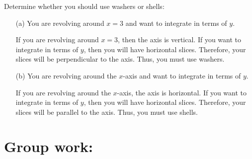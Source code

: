 \documentclass[handout]{ximera}
\begin{document}
	\begin{problem}
Determine whether you should use washers or shells:
\begin{itemize}

	\item[(a)] You are revolving around $x=3$ and want to integrate in terms of $y$.

	\begin{freeResponse}
	If you are revolving around $x=3$, then the axis is vertical.  If you want to integrate in terms of $y$, then you will have horizontal slices.  Therefore, your slices will be perpendicular to the axis.  Thus, you must use washers.
	\end{freeResponse}
	
	\item[(b)] You are revolving around the $x$-axis and want to integrate in terms of $y$.

	\begin{freeResponse}
	If you are revolving around the $x$-axis, the axis is horizontal.  If you want to integrate in terms of $y$, then you will have horizontal slices.  Therefore, your slices will be parallel to the axis.  Thus, you must use shells.
	\end{freeResponse}

\end{itemize}


\end{problem}
	
\begin{instructorNotes}

\end{instructorNotes}








\section{Group work:}
\end{document}
